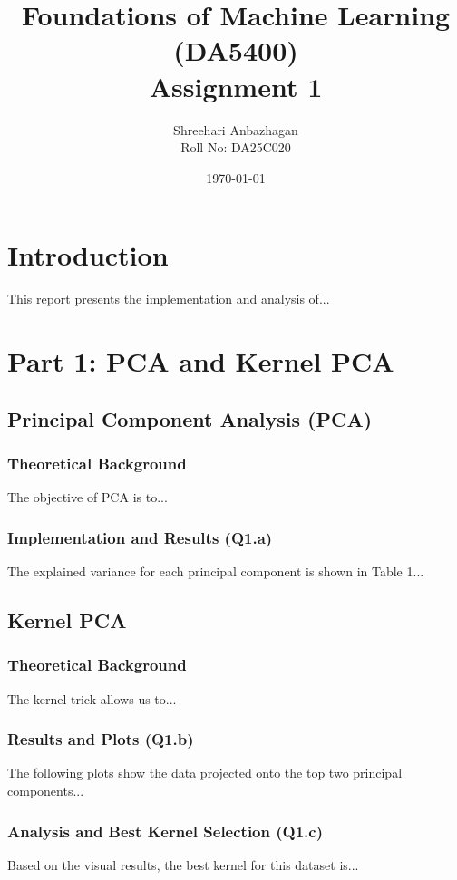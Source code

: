 \documentclass[12pt, a4paper]{article}
\title{Foundations of Machine Learning (DA5400) \\ \large Assignment 1}
\author{Shreehari Anbazhagan \\ Roll No: DA25C020}
\date{\today} %
\begin{document}
\maketitle %

\section{Introduction}
This report presents the implementation and analysis of...

\section{Part 1: PCA and Kernel PCA}

    \subsection{Principal Component Analysis (PCA)}
        \subsubsection{Theoretical Background}
        The objective of PCA is to...
        
        \subsubsection{Implementation and Results (Q1.a)}
        The explained variance for each principal component is shown in Table 1...

    \subsection{Kernel PCA}
        \subsubsection{Theoretical Background}
        The kernel trick allows us to...
        
        \subsubsection{Results and Plots (Q1.b)}
        The following plots show the data projected onto the top two principal components...
        
        \subsubsection{Analysis and Best Kernel Selection (Q1.c)}
        Based on the visual results, the best kernel for this dataset is...
\end{document}
